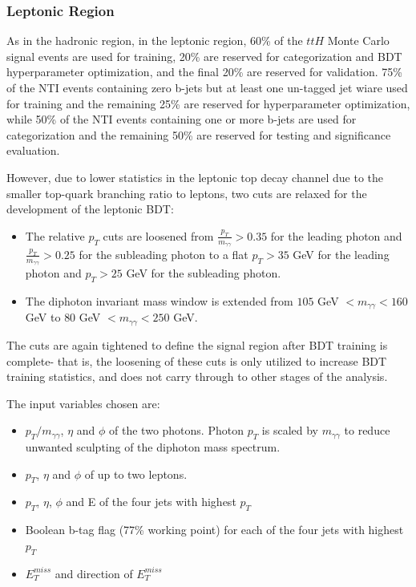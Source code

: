 \subsubsection{Leptonic Region} \label{sec:SBBDTlep} 

As in the hadronic region, in the leptonic region, 60\% of the $ttH$ Monte Carlo signal events are used for training, 20\% are reserved for categorization and BDT hyperparameter optimization, and the final 20\% are reserved for validation. 75\% of the NTI events containing zero b-jets but at least one un-tagged jet wiare used for training and the remaining 25\% are reserved for hyperparameter optimization, while 50\% of the NTI events containing one or more b-jets are used for categorization and the remaining 50\% are reserved for testing and significance evaluation.

However, due to lower statistics in the leptonic top decay channel due to the smaller top-quark branching ratio to leptons, two cuts are relaxed for the development of the leptonic BDT:

\begin{itemize}
\item The relative $p_{T}$ cuts are loosened from $\frac{p_{T}}{m_{\gamma\gamma}} > 0.35$ for the leading photon and $\frac{p_{T}}{m_{\gamma\gamma}} > 0.25$ for the subleading photon to a flat $p_{T} > 35$ GeV for the leading photon and $p_{T} > 25$ GeV for the subleading photon.
\item The diphoton invariant mass window is extended from $105$ GeV $< m_{\gamma \gamma} < 160$ GeV to $80$ GeV $< m_{\gamma \gamma} < 250$ GeV.
\end{itemize}

The cuts are again tightened to define the signal region after BDT training is complete- that is, the loosening of these cuts is only utilized to increase BDT training statistics, and does not carry through to other stages of the analysis.

The input variables chosen are: 

\begin{itemize}
\item $p_T/m_{\gamma \gamma}$, $\eta$ and $\phi$ of the two photons. Photon $p_{T}$ is scaled by $m_{\gamma \gamma}$ to reduce unwanted sculpting of the diphoton mass spectrum.
\item $p_T$, $\eta$ and $\phi$ of up to two leptons. 
\item $p_T$, $\eta$, $\phi$ and E of the four jets with highest $p_{T}$
\item Boolean b-tag flag (77\% working point) for each of the four jets with highest $p_{T}$
\item $E_T^{miss}$ and direction of $E_T^{miss}$
\end{itemize}

